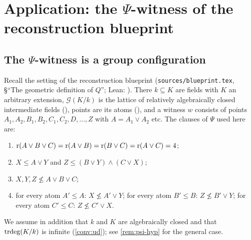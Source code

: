 \section{Application: the $\Psi$-witness of the reconstruction blueprint}
\label{sec:application}

\subsection{The $\Psi$-witness is a group configuration}

Recall the setting of the reconstruction blueprint (\texttt{sources/blueprint.tex},
\S``The geometric definition of $Q$''; Lean: ).  There
$k\subseteq K$ are fields with $K$ an arbitrary extension, $\mathcal G(K/k)$ is the lattice
of relatively algebraically closed intermediate fields (), points
are its atoms (), and a witness $w$ consists of points
$A_1,A_2,B_1,B_2,C_1,C_2,D,\dots,Z$ with $A=A_1\vee A_2$ etc.  The clauses of $\Psi$ used
here are:
\begin{enumerate}[label=(\roman*),nosep]
\item $\operatorname{r}(A\vee B\vee C)=\operatorname{r}(A\vee B)=\operatorname{r}(B\vee C)=\operatorname{r}(A\vee C)=4$;
\item $X\le A\vee Y$ and $Z\le(B\vee Y)\wedge(C\vee X)$;
\item $X,Y,Z\not\le A\vee B\vee C$;
\item for every atom $A'\le A$: $X\not\le A'\vee Y$; for every atom $B'\le B$:
  $Z\not\le B'\vee Y$; for every atom $C'\le C$: $Z\not\le C'\vee X$.
\end{enumerate}
We assume in addition that $k$ and $K$ are algebraically closed and that
$\operatorname{trdeg}(K/k)$ is infinite (\cref{conv:ud}); see \cref{rem:psi-hyp} for the general case.

